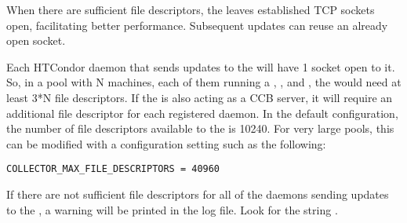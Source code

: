 When there are sufficient file descriptors, the  leaves
established TCP sockets open, facilitating better performance.
Subsequent updates can reuse an already open socket.

Each HTCondor daemon that sends updates to the  will have
1 socket open to it.
So, in a pool with N machines, each of them running a ,
, and , the  would
need at least 3*N file descriptors.  If the  is also
acting as a CCB server, it will require an additional file descriptor for
each registered daemon.
In the default configuration,
the number of file descriptors available to the 
is 10240.
For very large pools, this can be modified with a configuration setting
such as the following:

\begin{verbatim}
COLLECTOR_MAX_FILE_DESCRIPTORS = 40960
\end{verbatim}

If there are not sufficient file descriptors for all of the daemons
sending updates to the , a warning will be printed in the
 log file.  Look for the string
.

